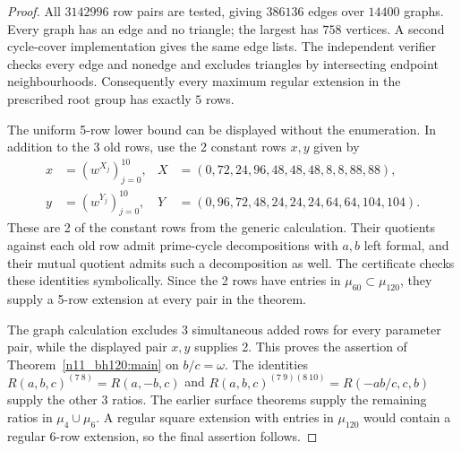 \documentclass[11pt,a4paper]{article}
\theoremstyle{plain}
\theoremstyle{definition}
\theoremstyle{plain}
\begin{document}
\begin{proof}
All $3142996$ row pairs are tested, giving $386136$ edges over $14400$ graphs. Every graph has an edge and no triangle; the largest has $758$ vertices. A second cycle-cover implementation gives the same edge lists. The independent verifier checks every edge and nonedge and excludes triangles by intersecting endpoint neighbourhoods. Consequently every maximum regular extension in the prescribed root group has exactly $5$ rows.

\medskip
The uniform 5-row lower bound can be displayed without the enumeration. In addition to the 3 old rows, use the 2 constant rows $x,y$ given by
\[
\begin{aligned}
x&=(w^{X_j})_{j=0}^{10},
&X&=(0,72,24,96,48,48,48,8,8,88,88),\\
y&=(w^{Y_j})_{j=0}^{10},
&Y&=(0,96,72,48,24,24,24,64,64,104,104).
\end{aligned}
\]
These are 2 of the constant rows from the generic calculation. Their quotients against each old row admit prime-cycle decompositions with $a,b$ left formal, and their mutual quotient admits such a decomposition as well. The certificate checks these identities symbolically. Since the 2 rows have entries in $\mu_{60}\subset\mu_{120}$, they supply a 5-row extension at every pair in the theorem.

The graph calculation excludes 3 simultaneous added rows for every parameter pair, while the displayed pair $x,y$ supplies 2. This proves the assertion of Theorem~\ref{n11_bh120:main} on $b/c=\omega$. The identities $R(a,b,c)^{(7\ 8)}=R(a,-b,c)$ and $R(a,b,c)^{(7\ 9)(8\ 10)}=R(-ab/c,c,b)$ supply the other 3 ratios. The earlier surface theorems supply the remaining ratios in $\mu_4\cup\mu_6$. A regular square extension with entries in $\mu_{120}$ would contain a regular 6-row extension, so the final assertion follows.
\end{proof}
\end{document}
